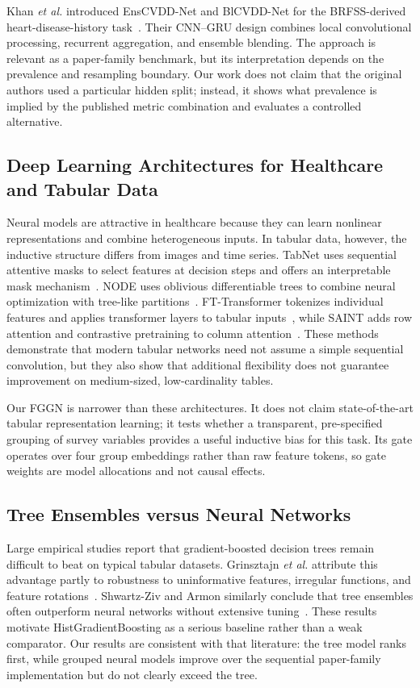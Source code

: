 \documentclass[conference,10pt]{IEEEtran}
\begin{document}
Khan \emph{et al.} introduced EnsCVDD-Net and BlCVDD-Net for the BRFSS-derived heart-disease-history task~\cite{khan2024heart}. Their CNN--GRU design combines local convolutional processing, recurrent aggregation, and ensemble blending. The approach is relevant as a paper-family benchmark, but its interpretation depends on the prevalence and resampling boundary. Our work does not claim that the original authors used a particular hidden split; instead, it shows what prevalence is implied by the published metric combination and evaluates a controlled alternative.

\subsection{Deep Learning Architectures for Healthcare and Tabular Data}
Neural models are attractive in healthcare because they can learn nonlinear representations and combine heterogeneous inputs. In tabular data, however, the inductive structure differs from images and time series. TabNet uses sequential attentive masks to select features at decision steps and offers an interpretable mask mechanism~\cite{arik2021tabnet}. NODE uses oblivious differentiable trees to combine neural optimization with tree-like partitions~\cite{popov2020neural}. FT-Transformer tokenizes individual features and applies transformer layers to tabular inputs~\cite{gorishniy2021revisiting}, while SAINT adds row attention and contrastive pretraining to column attention~\cite{somepalli2021saint}. These methods demonstrate that modern tabular networks need not assume a simple sequential convolution, but they also show that additional flexibility does not guarantee improvement on medium-sized, low-cardinality tables.

Our FGGN is narrower than these architectures. It does not claim state-of-the-art tabular representation learning; it tests whether a transparent, pre-specified grouping of survey variables provides a useful inductive bias for this task. Its gate operates over four group embeddings rather than raw feature tokens, so gate weights are model allocations and not causal effects.

\subsection{Tree Ensembles versus Neural Networks}
Large empirical studies report that gradient-boosted decision trees remain difficult to beat on typical tabular datasets. Grinsztajn \emph{et al.} attribute this advantage partly to robustness to uninformative features, irregular functions, and feature rotations~\cite{grinsztajn2022tree}. Shwartz-Ziv and Armon similarly conclude that tree ensembles often outperform neural networks without extensive tuning~\cite{shwartz2022tabular}. These results motivate HistGradientBoosting as a serious baseline rather than a weak comparator. Our results are consistent with that literature: the tree model ranks first, while grouped neural models improve over the sequential paper-family implementation but do not clearly exceed the tree.
\end{document}
